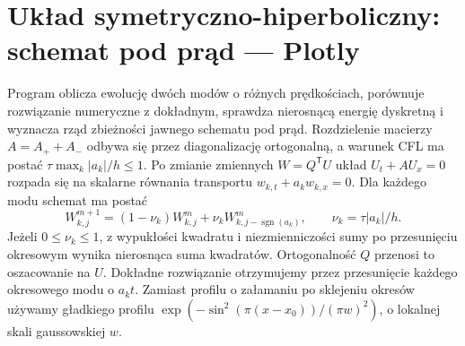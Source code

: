 \section{Układ symetryczno-hiperboliczny: schemat pod prąd — Plotly}
\label{sec:pde21-code}
Program oblicza ewolucję dwóch modów o różnych prędkościach,
porównuje rozwiązanie numeryczne z dokładnym,
sprawdza nierosnącą energię dyskretną i wyznacza rząd
zbieżności jawnego schematu pod prąd. Rozdzielenie macierzy
$A=A_++A_-$ odbywa się przez diagonalizację ortogonalną,
a warunek CFL ma postać $\tau\max_k|a_k|/h\le1$.
Po zmianie zmiennych $W=Q^{\mathsf T}U$ układ
$U_t+AU_x=0$ rozpada się na skalarne równania
transportu $w_{k,t}+a_kw_{k,x}=0$.
Dla każdego modu schemat ma postać
\[
 W_{k,j}^{m+1}=(1-\nu_k)W_{k,j}^m+
 \nu_k W_{k,j-\operatorname{sgn}(a_k)}^m,\qquad
 \nu_k=\tau|a_k|/h.
\]
Jeżeli $0\le\nu_k\le1$, z wypukłości kwadratu
i niezmienniczości sumy po przesunięciu okresowym
wynika nierosnąca suma kwadratów. Ortogonalność $Q$
przenosi to oszacowanie na $U$.
Dokładne rozwiązanie otrzymujemy przez przesunięcie
każdego okresowego modu o $a_kt$.
Zamiast profilu o załamaniu po sklejeniu okresów
używamy gładkiego profilu
$\exp(-\sin^2(\pi(x-x_0))/(\pi w)^2)$,
o lokalnej skali gaussowskiej $w$.
